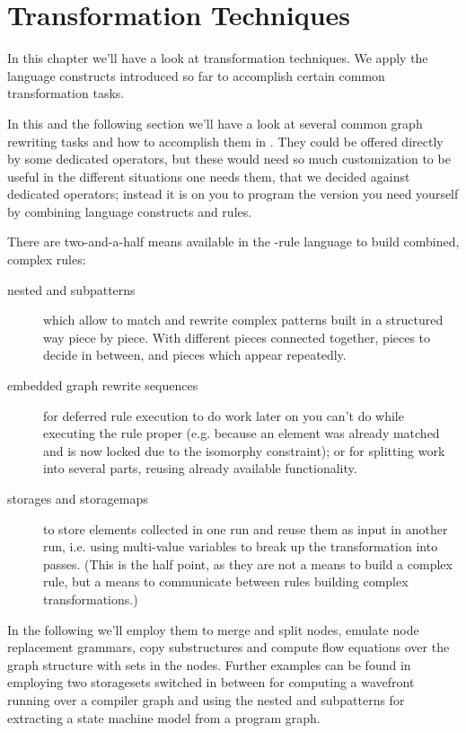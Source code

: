 \chapter{Transformation Techniques}
\label{cha:techniques}
\label{sub:mergesplit}

In this chapter we'll have a look at transformation techniques.
We apply the language constructs introduced so far to accomplish certain common transformation tasks.

In this and the following section we'll have a look at several common graph rewriting tasks and how to accomplish them in \GrG.
They could be offered directly by some dedicated operators,
but these would need so much customization to be useful in the different situations one needs them,
that we decided against dedicated operators;
instead it is on you to program the version you need yourself by combining language constructs and rules.

There are two-and-a-half means available in the \GrG-rule language to build combined, complex rules:
\begin{description}
	\item[nested and subpatterns]
which allow to match and rewrite complex patterns built in a structured way piece by piece.
With different pieces connected together, pieces to decide in between, and pieces which appear repeatedly.
	\item[embedded graph rewrite sequences]
for deferred rule execution to do work later on you can't do while executing the rule proper (e.g. because an element was already matched and is now locked due to the isomorphy constraint); or for splitting work into several parts, reusing already available functionality.
	\item[storages and storagemaps]
to store elements collected in one run and reuse them as input in another run, i.e. using multi-value variables to break up the transformation into passes. (This is the half point, as they are not a means to build a complex rule, but a means to communicate between rules building complex transformations.)
\end{description}

\noindent In the following we'll employ them to merge and split nodes, emulate node replacement grammars, copy substructures and compute flow equations over the graph structure with sets in the nodes.
Further examples can be found in \cite{CompilerOptimization} employing two storagesets switched in between for computing a wavefront running over a compiler graph and \cite{ProgramUnderstanding} using the nested and subpatterns for extracting a state machine model from a program graph.

